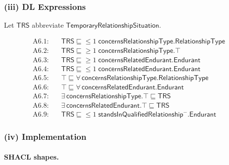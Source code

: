 \documentclass[12pt,a4paper]{article}
\begin{document}
\subsubsection*{(iii) DL Expressions}

Let $\mathsf{TRS}$ abbreviate $\mathsf{TemporaryRelationshipSituation}$.

\begin{align*}
  \text{A6.1:}&\quad \mathsf{TRS} \sqsubseteq {\leq}1\;\mathsf{concernsRelationshipType}.\mathsf{RelationshipType} \\
  \text{A6.2:}&\quad \mathsf{TRS} \sqsubseteq {\geq}1\;\mathsf{concernsRelationshipType}.\top \\
  \text{A6.3:}&\quad \mathsf{TRS} \sqsubseteq {\geq}1\;\mathsf{concernsRelatedEndurant}.\mathsf{Endurant} \\
  \text{A6.4:}&\quad \mathsf{TRS} \sqsubseteq {\leq}1\;\mathsf{concernsRelatedEndurant}.\mathsf{Endurant} \\
  \text{A6.5:}&\quad \top \sqsubseteq \forall\,\mathsf{concernsRelationshipType}.\mathsf{RelationshipType} \\
  \text{A6.6:}&\quad \top \sqsubseteq \forall\,\mathsf{concernsRelatedEndurant}.\mathsf{Endurant} \\
  \text{A6.7:}&\quad \exists\,\mathsf{concernsRelationshipType}.\top \sqsubseteq \mathsf{TRS} \\
  \text{A6.8:}&\quad \exists\,\mathsf{concernsRelatedEndurant}.\top \sqsubseteq \mathsf{TRS} \\
  \text{A6.9:}&\quad \mathsf{TRS} \sqsubseteq {\leq}1\;\mathsf{standsInQualifiedRelationship}^{-}.\mathsf{Endurant}
\end{align*}

\subsubsection*{(iv) Implementation}

\paragraph{SHACL shapes.}
\end{document}

